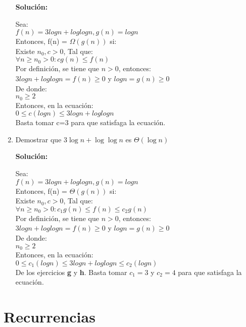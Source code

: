 \documentclass{article}
\begin{document}
\begin{enumerate}[label=\textbf{\alph*.}]
  \textbf{Solución:}

  Sea: \\
  $f(n) = 3logn + loglogn,  g(n) = logn$\\
    Entonces, f(n) = $\Omega (g(n))$ si:\\
  Existe $n_0, c > 0$, Tal que:\\
  $\forall n \geq n_0 > 0 : cg(n) \leq f(n)$\\
  
  Por definición, se tiene que $n > 0$, entonces:\\
  $3logn + loglogn=f(n) \geq 0$ y $logn=g(n) \geq 0$\\
  De donde:\\
  $ n_0 \geq 2$\\
  Entonces, en la ecuación:\\
  $0 \leq c(logn) \leq 3logn + loglogn$\\
  Basta tomar c=3 para que satisfaga la ecuación.
  
  \item Demostrar que $3 \log n + \log \log n$ es $\Theta (\log n)$
  
  \textbf{Solución:}

  Sea: \\
  $f(n) = 3logn + loglogn,  g(n) = logn$\\
    Entonces, f(n) = $\Theta (g(n))$ si:\\
  Existe $n_0, c > 0$, Tal que:\\
  $\forall n \geq n_0 > 0 : c_1 g(n) \leq f(n) \leq c_2 g(n)$\\
  
  Por definición, se tiene que $n > 0$, entonces:\\
  $3logn + loglogn=f(n) \geq 0$ y $logn=g(n) \geq 0$\\
  De donde:\\
  $ n_0 \geq 2$\\
  Entonces, en la ecuación:\\
  $ 0 \leq c_1 (logn) \leq 3logn + loglogn \leq  c_2 (logn) $\\
  De los ejercicios \textbf{g} y \textbf{h}. Basta tomar $c_1=3$ y $c_2=4$ para que satisfaga la ecuación.


\end{enumerate}


\section{Recurrencias}
\end{document}
